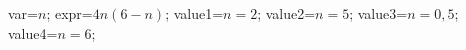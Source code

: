 \documentclass[exercice]{thedocument}%
\begin{document}
%
\>var=$n$;%
\>expr=$4n(6-n)$;%
\>value1=$n=2$;%
\>value2=$n=5$;%
\>value3=$n=0,5$;%
\>value4=$n=6$;%
%
\end{document}
